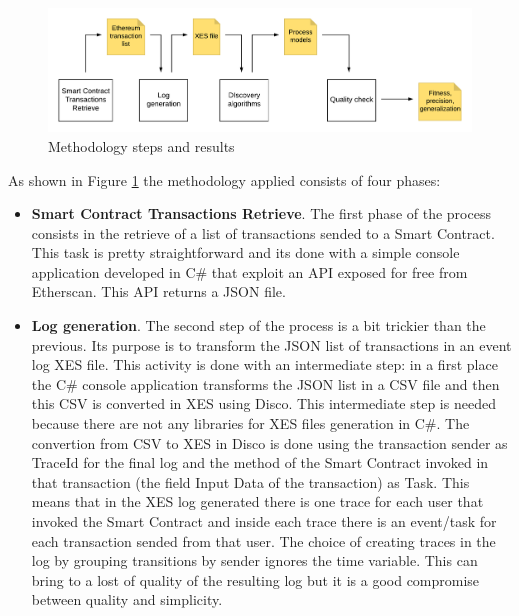 \begin{figure}[!ht]
    \centering
\includegraphics[width=\textwidth]{images/methodology.png}
    \caption{Methodology steps and results}
    \label{images:methodology}
\end{figure}

As shown in Figure \ref{images:methodology} the methodology applied consists of four phases:

\begin{itemize}

    \item \textbf{Smart Contract Transactions Retrieve}. The first phase of the process consists in the retrieve of a list of 
    transactions sended to a Smart Contract. This task is pretty straightforward and its done with a simple console 
    application developed in C\# that exploit an API exposed for free from Etherscan. This API returns a JSON file.

    \item \textbf{Log generation}. The second step of the process is a bit trickier than the previous. Its purpose is to 
    transform the JSON list of transactions in an event log XES file. This activity is done with an intermediate step: in a 
    first place the C\# console application transforms the JSON list in a CSV file and then this CSV is converted in XES using 
    Disco. This intermediate step is needed because there are not any libraries for XES files generation in C\#. The convertion 
    from CSV to XES in Disco is done using the transaction sender as TraceId for the final log and the method of the Smart 
    Contract invoked in that transaction (the field Input Data of the transaction) as Task. This means that in the XES log 
    generated there is one trace for each user that invoked the Smart Contract and inside each trace there is an event/task for 
    each transaction sended from that user.
    The choice of creating traces in the log by grouping transitions by sender ignores the time variable. This can bring to a 
    lost of quality of the resulting log but it is a good compromise between quality and simplicity.


\end{itemize}
